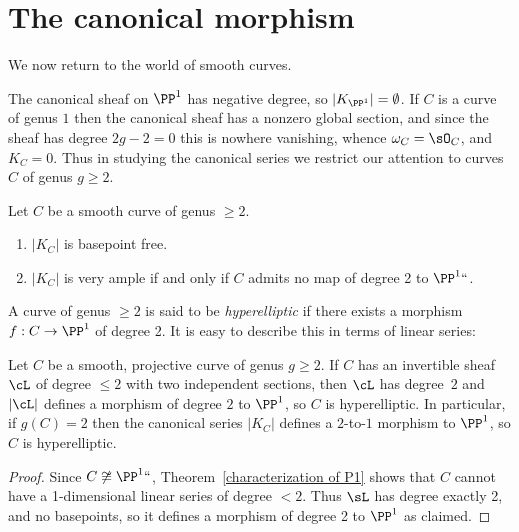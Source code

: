 \section{The canonical morphism}

We now return to the world of smooth curves.
%

 The canonical sheaf on $\PP^1$ has negative degree, so $|K_{\PP^1}| = \emptyset$. If $C$ is a curve
 of genus $1$ then the canonical sheaf     has a nonzero global section, and since the sheaf has degree $2g-2=0$ this is nowhere vanishing, whence
 $\omega_C = \sO_C$, and $K_C = 0$. Thus in studying the canonical series we restrict our attention to curves $C$ of genus $g\geq 2$. 
 
 \begin{theorem}\label{canonical series is very ample} Let $C$ be a smooth curve of genus $\geq 2$.
\begin{enumerate}
 \item $|K_C|$ is basepoint free.
 \item $|K_C|$ is very ample if and only if $C$ admits no map of degree 2 to $\PP^1` `$.
\unif
\end{enumerate}
\end{theorem}

A curve of genus $\geq 2$
is said to be \emph{hyperelliptic} if there exists a 
morphism
$f: C \to \PP^1$ 
of degree 2.
%
%
It is easy to describe this in terms of linear series:

\begin{lemma}\label{deg 2 morphism}
Let $C$ be a smooth, projective curve of genus $g\geq 2$. If $C$ has an invertible sheaf $\cL$ of degree $\leq 2$ with two independent sections, then $\cL$ has degree~$2$ and
$|\cL|$ defines a morphism of degree $2$ to $\PP^{1}$, so $C$ is
hyperelliptic. In particular, if $g(C) = 2$ then the canonical series
$|K_{C}|$ defines a $2$-to-$1$ morphism to $\PP^{1}$, so $C$ is
hyperelliptic.
\unif
\end{lemma}

\begin{proof}
Since $C \not\cong \PP^1` `$,  Theorem~\ref{characterization of P1} shows that $C$ cannot have a 1-dimensional linear series
of degree $< 2$. Thus $\sL$ has degree exactly 2, and no 
basepoints,
so it defines a morphism of degree 2 to $\PP^1$ as claimed.
\end{proof}

